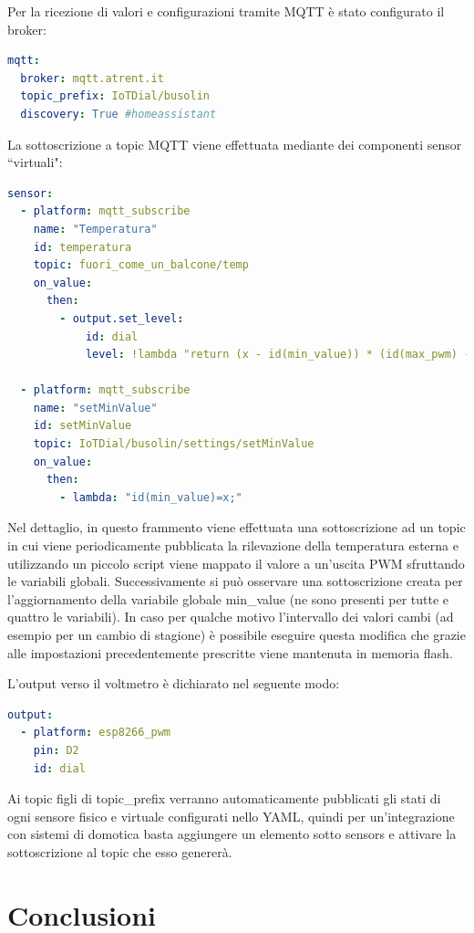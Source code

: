 \documentclass[12pt,a4paper]{report}
\begin{document}
Per la ricezione di valori e configurazioni tramite MQTT è stato configurato il broker:
\begin{lstlisting}[language=yaml]
mqtt:
  broker: mqtt.atrent.it
  topic_prefix: IoTDial/busolin
  discovery: True #homeassistant
\end{lstlisting}
La sottoscrizione a topic MQTT viene effettuata mediante dei componenti sensor ``virtuali":
\begin{lstlisting}[language=yaml]
sensor:
  - platform: mqtt_subscribe
    name: "Temperatura"
    id: temperatura
    topic: fuori_come_un_balcone/temp
    on_value:
      then:
        - output.set_level:
            id: dial
            level: !lambda "return (x - id(min_value)) * (id(max_pwm) - id(min_pwm)) / (id(max_value) - id(min_value)) + id(min_pwm);"

  - platform: mqtt_subscribe
    name: "setMinValue"
    id: setMinValue
    topic: IoTDial/busolin/settings/setMinValue
    on_value:
      then:
        - lambda: "id(min_value)=x;"
\end{lstlisting}
Nel dettaglio, in questo frammento viene effettuata una sottoscrizione ad un topic in cui viene periodicamente pubblicata
la rilevazione della temperatura esterna e utilizzando un piccolo script viene mappato il valore a un'uscita PWM sfruttando le variabili
globali.
Successivamente si può osservare una sottoscrizione creata per l'aggiornamento della variabile globale min_value (ne sono presenti
per tutte e quattro le variabili). In caso per qualche motivo l'intervallo dei valori cambi (ad esempio per un cambio di stagione) è
possibile eseguire questa modifica che grazie alle impostazioni precedentemente prescritte viene mantenuta in memoria flash.

L'output verso il voltmetro è dichiarato nel seguente modo:
\begin{lstlisting}[language=yaml]
output:
  - platform: esp8266_pwm
    pin: D2
    id: dial
\end{lstlisting}

Ai topic figli di topic_prefix verranno automaticamente pubblicati gli stati di ogni sensore fisico e virtuale configurati nello YAML,
quindi per un'integrazione con sistemi di domotica basta aggiungere un elemento sotto sensors e attivare la sottoscrizione al
topic che esso genererà.

\chapter{Conclusioni}
\end{document}
